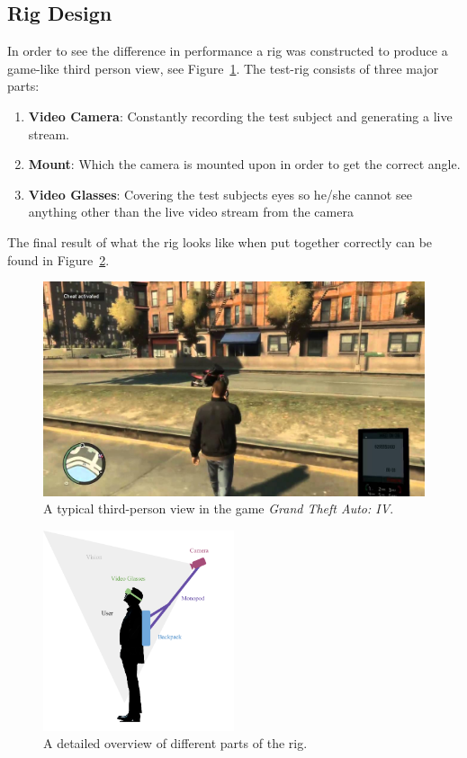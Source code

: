 \documentclass[runningheads,a4paper,oribibl]{llncs}
\begin{document}
\subsection{Rig Design}
In order to see the difference in performance a rig was constructed to produce a game-like third person view, see Figure~\ref{fig:GTAIV}. The test-rig consists of three major parts:
\begin{enumerate}
	\item \textbf{Video Camera}: Constantly recording the test subject and generating a live stream.
	\item \textbf{Mount}: Which the camera is mounted upon in order to get the correct angle.
	\item \textbf{Video Glasses}: Covering the test subjects eyes so he/she cannot see anything other than the live video stream from the camera
\end{enumerate}
The final result of what the rig looks like when put together correctly can be found in Figure~\ref{fig:RigDesign}.

\begin{figure}
   \includegraphics[width=\textwidth]{GTA}
   \caption{A typical third-person view in the game \emph{Grand Theft Auto: IV}. \label{fig:GTAIV}}
\end{figure}

\begin{figure}
   \includegraphics[width=0.5\textwidth]{Rig}
   \caption{A detailed overview of different parts of the rig. \label{fig:RigDesign}}
\end{figure}
\end{document}
